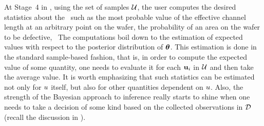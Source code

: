 At Stage~4 in , using the set of samples $\mathcal{U}$, the user computes the desired statistics about the \qoi\ such as the most probable value of the effective channel length at an arbitrary point on the wafer, the probability of an area on the wafer to be defective, \etc\ The computations boil down to the estimation of expected values with respect to the posterior distribution of ${\boldsymbol\theta}$.
This estimation is done in the standard sample-based fashion, that is, in order to compute the expected value of some quantity, one needs to evaluate it for each $\mathbf{u}_i$ in $\mathcal{U}$ and then take the average value.
It is worth emphasizing that such statistics can be estimated not only for $u$ itself, but also for other quantities dependent on $u$.
Also, the strength of the Bayesian approach to inference really starts to shine when one needs to take a decision of some kind based on the collected observations in $\mathcal{D}$ (recall the discussion in ).

